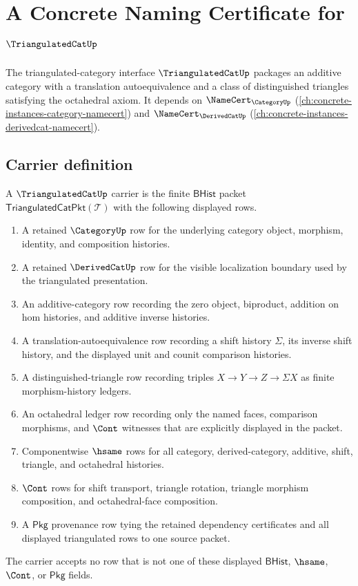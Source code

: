 \chapter{A Concrete Naming Certificate for $\TriangulatedCatUp$}
\label{ch:concrete-instances-triangulatedcat-namecert}

The triangulated-category interface $\TriangulatedCatUp$ packages an additive category with a translation autoequivalence and a class of distinguished triangles satisfying the octahedral axiom. It depends on $\NameCert_{\CategoryUp}$ (\autoref{ch:concrete-instances-category-namecert}) and $\NameCert_{\DerivedCatUp}$ (\autoref{ch:concrete-instances-derivedcat-namecert}).

\section{Carrier definition}
\label{sec:triangulatedcat-carrier}

\begin{definition}
\label{def:triangulatedcat-carrier}
A $\TriangulatedCatUp$ carrier is the finite $\mathsf{BHist}$ packet
$\mathsf{TriangulatedCatPkt}(\mathcal{T})$ with the following displayed rows.
\begin{enumerate}
  \item A retained $\CategoryUp$ row for the underlying category object,
  morphism, identity, and composition histories.
  \item A retained $\DerivedCatUp$ row for the visible localization boundary
  used by the triangulated presentation.
  \item An additive-category row recording the zero object, biproduct,
  addition on hom histories, and additive inverse histories.
  \item A translation-autoequivalence row recording a shift history
  $\Sigma$, its inverse shift history, and the displayed unit and counit
  comparison histories.
  \item A distinguished-triangle row recording triples
  $X\to Y\to Z\to \Sigma X$ as finite morphism-history ledgers.
  \item An octahedral ledger row recording only the named faces, comparison
  morphisms, and $\Cont$ witnesses that are explicitly displayed in the
  packet.
  \item Componentwise $\hsame$ rows for all category, derived-category,
  additive, shift, triangle, and octahedral histories.
  \item $\Cont$ rows for shift transport, triangle rotation, triangle
  morphism composition, and octahedral-face composition.
  \item A $\mathsf{Pkg}$ provenance row tying the retained dependency
  certificates and all displayed triangulated rows to one source packet.
\end{enumerate}
The carrier accepts no row that is not one of these displayed
$\mathsf{BHist}$, $\hsame$, $\Cont$, or $\mathsf{Pkg}$ fields.
\end{definition}

